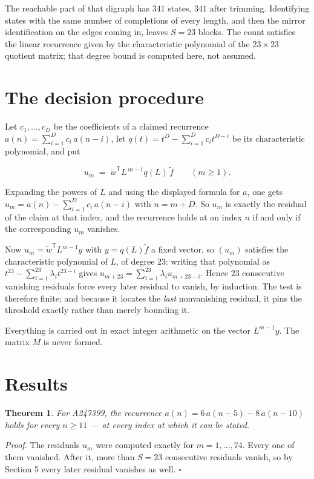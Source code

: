 \documentclass[11pt]{article}
\newtheorem{theorem}{Theorem}
\theoremstyle{definition}
\begin{document}
The reachable part of that digraph has $341$ states, $341$ after trimming. Identifying states with the same number of completions of every length, and then the mirror identification on the edges coming in, leaves $S = 23$ blocks. The count satisfies the linear recurrence given by the characteristic polynomial of the $23\times23$ quotient matrix; that degree bound is computed here, not assumed.

\section{The decision procedure}

Let $c_1,\dots,c_D$ be the coefficients of a claimed recurrence $a(n) = \sum_{i=1}^{D} c_i\,a(n-i)$, let $q(t) = t^{D} - \sum_{i=1}^{D} c_i t^{D-i}$ be its characteristic polynomial, and put

\[u_m \;=\; \tilde w^{\mathsf T} L^{\,m-1} q(L)\,\tilde f \qquad (m \ge 1).\]

Expanding the powers of $L$ and using the displayed formula for $a$, one gets $u_m = a(n) - \sum_{i=1}^{D} c_i\,a(n-i)$ with $n = m + D$. So $u_m$ is exactly the residual of the claim at that index, and the recurrence holds at an index $n$ if and only if the corresponding $u_m$ vanishes.

Now $u_m = \tilde w^{\mathsf T} L^{m-1} y$ with $y = q(L)\tilde f$ a fixed vector, so $(u_m)$ satisfies the characteristic polynomial of $L$, of degree $23$: writing that polynomial as $t^{23} - \sum_{i=1}^{23} \lambda_i t^{23-i}$ gives $u_{m+23} = \sum_{i=1}^{23} \lambda_i u_{m+23-i}$. Hence $23$ consecutive vanishing residuals force every later residual to vanish, by induction. The test is therefore finite; and because it locates the {\itshape last} nonvanishing residual, it pins the threshold exactly rather than merely bounding it.

Everything is carried out in exact integer arithmetic on the vector $L^{m-1}y$. The matrix $M$ is never formed.

\section{Results}

\begin{theorem} For A247399, the recurrence $a(n) = 6\,a(n-5) - 8\,a(n-10)$ holds for every $n \ge 11$ --- at every index at which it can be stated.\end{theorem}

{\itshape Proof.} The residuals $u_m$ were computed exactly for $m = 1,\dots,74$. Every one of them vanished. After it, more than $S = 23$ consecutive residuals vanish, so by Section 5 every later residual vanishes as well. $\square$
\end{document}
